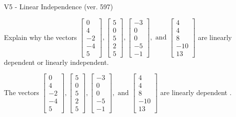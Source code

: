 \begin{exercise}
  \begin{exerciseTitle}V5 - Linear Independence (ver. 597)\end{exerciseTitle}
  \begin{exerciseStatement}
    Explain why the vectors \(\left[\begin{array}{r}
0 \\
4 \\
-2 \\
-4 \\
5
\end{array}\right] , \left[\begin{array}{r}
5 \\
0 \\
5 \\
2 \\
5
\end{array}\right] , \left[\begin{array}{r}
-3 \\
0 \\
0 \\
-5 \\
-1
\end{array}\right] , \text{ and } \left[\begin{array}{r}
4 \\
4 \\
8 \\
-10 \\
13
\end{array}\right]\) are linearly dependent or linearly independent.	


  \end{exerciseStatement}
  \begin{exerciseAnswer}
   The vectors \(\left[\begin{array}{r}
0 \\
4 \\
-2 \\
-4 \\
5
\end{array}\right] , \left[\begin{array}{r}
5 \\
0 \\
5 \\
2 \\
5
\end{array}\right] , \left[\begin{array}{r}
-3 \\
0 \\
0 \\
-5 \\
-1
\end{array}\right] , \text{ and } \left[\begin{array}{r}
4 \\
4 \\
8 \\
-10 \\
13
\end{array}\right]\) are 
  	 linearly dependent  .
  


  \end{exerciseAnswer}
\end{exercise}